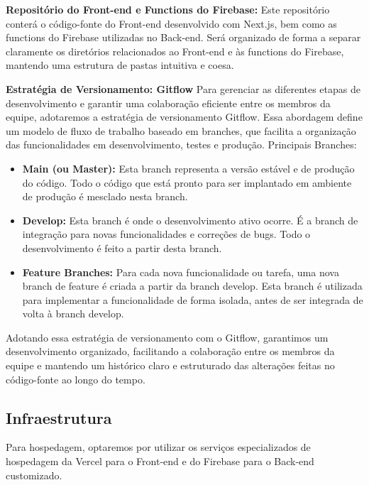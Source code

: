 \textbf{Repositório do Front-end e Functions do Firebase:} \newline
Este repositório conterá o código-fonte do Front-end desenvolvido com Next.js, bem como as functions do Firebase utilizadas no Back-end. Será organizado de forma a separar claramente os diretórios relacionados ao Front-end e às functions do Firebase, mantendo uma estrutura de pastas intuitiva e coesa.

\textbf{Estratégia de Versionamento: Gitflow} \newline
Para gerenciar as diferentes etapas de desenvolvimento e garantir uma colaboração eficiente entre os membros da equipe, adotaremos a estratégia de versionamento Gitflow. Essa abordagem define um modelo de fluxo de trabalho baseado em branches, que facilita a organização das funcionalidades em desenvolvimento, testes e produção.
Principais Branches:

\begin{itemize}
\item \textbf{Main (ou Master):} Esta branch representa a versão estável e de produção do código. Todo o código que está pronto para ser implantado em ambiente de produção é mesclado nesta branch.

\item \textbf{Develop:} Esta branch é onde o desenvolvimento ativo ocorre. É a branch de integração para novas funcionalidades e correções de bugs. Todo o desenvolvimento é feito a partir desta branch.

\item \textbf{Feature Branches:} Para cada nova funcionalidade ou tarefa, uma nova branch de feature é criada a partir da branch develop. Esta branch é utilizada para implementar a funcionalidade de forma isolada, antes de ser integrada de volta à branch develop.
\end{itemize}
 
Adotando essa estratégia de versionamento com o Gitflow, garantimos um desenvolvimento organizado, facilitando a colaboração entre os membros da equipe e mantendo um histórico claro e estruturado das alterações feitas no código-fonte ao longo do tempo.

\subsection{Infraestrutura}
Para hospedagem, optaremos por utilizar os serviços especializados de hospedagem da Vercel para o Front-end e do Firebase para o Back-end customizado.

